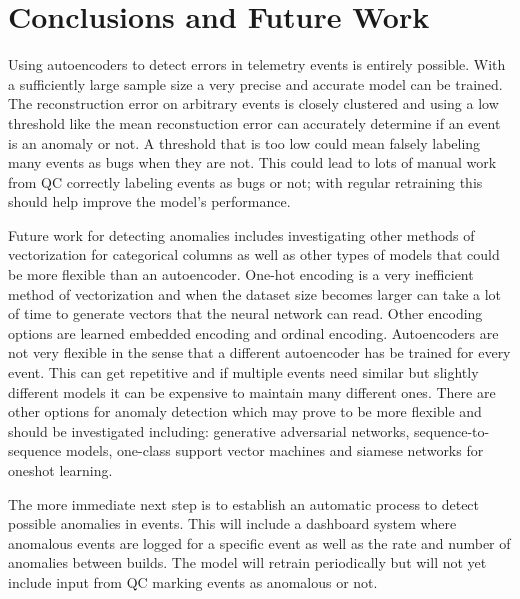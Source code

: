 \documentclass[a4paper,11pt]{article}
\begin{document}
\section{Conclusions and Future Work}
Using autoencoders to detect errors in telemetry events is entirely possible. With a sufficiently large sample size a very precise and accurate model can be trained. The reconstruction error on arbitrary events is closely clustered and using a low threshold like the mean reconstuction error can accurately determine if an event is an anomaly or not. A threshold that is too low could mean falsely labeling many events as bugs when they are not. This could lead to lots of manual work from QC correctly labeling events as bugs or not; with regular retraining this should help improve the model's performance.
\par
Future work for detecting anomalies includes investigating other methods of vectorization for categorical columns as well as other types of models that could be more flexible than an autoencoder. One-hot encoding is a very inefficient method of vectorization and when the dataset size becomes larger can take a lot of time to generate vectors that the neural network can read. Other encoding options are learned embedded encoding and ordinal encoding. Autoencoders are not very flexible in the sense that a different autoencoder has be trained for every event. This can get repetitive and if multiple events need similar but slightly different models it can be expensive to maintain many different ones. There are other options for anomaly detection which may prove to be more flexible and should be investigated including: generative adversarial networks, sequence-to-sequence models, one-class support vector machines and siamese networks for oneshot learning.
\par
The more immediate next step is to establish an automatic process to detect possible anomalies in events. This will include a dashboard system where anomalous events are logged for a specific event as well as the rate and number of anomalies between builds. The model will retrain periodically but will not yet include input from QC marking events as anomalous or not.
\end{document}
